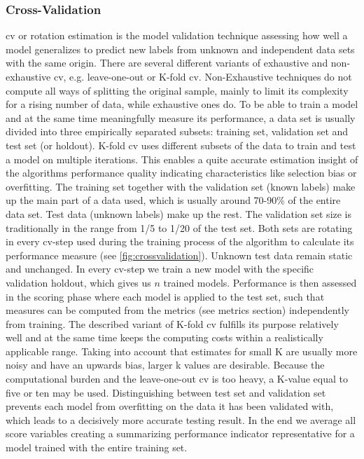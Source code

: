 \subsubsection{Cross-Validation}

\Acrshort{cv} or rotation estimation is the model validation technique assessing how well a model generalizes to predict new labels from unknown and independent data sets with the same origin. There are several different variants of exhaustive and non-exhaustive \acrshort{cv}, e.g. leave-one-out or K-fold \acrshort{cv}. Non-Exhaustive techniques do not compute all ways of splitting the original sample, mainly to limit its complexity for a rising number of data, while exhaustive ones do. To be able to train a model and at the same time meaningfully measure its performance, a data set is usually divided into three empirically separated subsets: training set, validation set and test set (or holdout). K-fold \acrshort{cv} uses different subsets of the data to train and test a model on multiple iterations. This enables a quite accurate estimation insight of the algorithms performance quality indicating characteristics like selection bias or \gls{overfitting}. The training set together with the validation set (known labels) make up the main part of a data used, which is usually around 70-90\% of the entire data set. Test data (unknown labels) make up the rest. The validation set size is traditionally in the range from 1/5 to 1/20 of the test set. Both sets are rotating in every \acrshort{cv}-step used during the training process of the algorithm to calculate its performance measure (see \cref{fig:crossvalidation}). Unknown test data remain static and unchanged. In every \acrshort{cv}-step we train a new model with the specific validation holdout, which gives us \( n \) trained models. Performance is then assessed in the scoring phase where each model is applied to the test set, such that measures can be computed from the metrics (see metrics section) independently from training. The described variant of K-fold \acrshort{cv} fulfills its purpose relatively well and at the same time keeps the computing costs within a realistically applicable range. Taking into account that estimates for small K are usually more noisy and have an upwards bias, larger k values are desirable. Because the computational burden and the leave-one-out \acrshort{cv} is too heavy, a K-value equal to five or ten may be used. \cite{Fushiki.2011} Distinguishing between test set and validation set prevents each model from \gls{overfitting} on the data it has been validated with, which leads to a decisively more accurate testing result. In the end we average all score variables creating a summarizing performance indicator representative for a model trained with the entire training set. 

